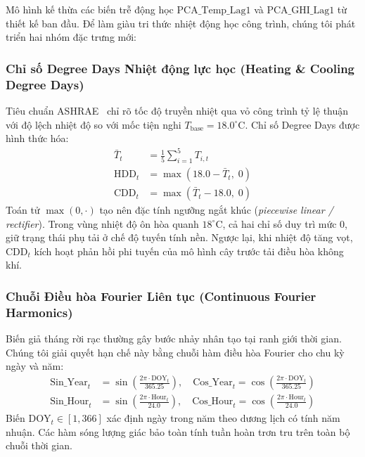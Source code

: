 Mô hình kế thừa các biến trễ động học $\text{PCA\_Temp\_Lag1}$ và $\text{PCA\_GHI\_Lag1}$ từ thiết kế ban đầu. Để làm giàu tri thức nhiệt động học công trình, chúng tôi phát triển hai nhóm đặc trưng mới:

\subsubsection{Chỉ số Degree Days Nhiệt động lực học (Heating \& Cooling Degree Days)}
\label{subsubsec:hdd_cdd}

Tiêu chuẩn ASHRAE~\cite{ashrae2021fundamentals} chỉ rõ tốc độ truyền nhiệt qua vỏ công trình tỷ lệ thuận với độ lệch nhiệt độ so với mốc tiện nghi $T_{\text{base}} = 18.0^\circ\text{C}$. Chỉ số Degree Days được hình thức hóa:
\begin{align}
    \bar{T}_t &= \frac{1}{5} \sum_{i=1}^5 T_{i, t} \\
    \text{HDD}_t &= \max\left(18.0 - \bar{T}_t, \; 0\right) \\
    \text{CDD}_t &= \max\left(\bar{T}_t - 18.0, \; 0\right)
\end{align}
Toán tử $\max(0, \cdot)$ tạo nên đặc tính ngưỡng ngắt khúc (\textit{piecewise linear / rectifier}). Trong vùng nhiệt độ ôn hòa quanh $18^\circ\text{C}$, cả hai chỉ số duy trì mức 0, giữ trạng thái phụ tải ở chế độ tuyến tính nền. Ngược lại, khi nhiệt độ tăng vọt, $\text{CDD}_t$ kích hoạt phản hồi phi tuyến của mô hình cây trước tải điều hòa không khí.

\subsubsection{Chuỗi Điều hòa Fourier Liên tục (Continuous Fourier Harmonics)}
\label{subsubsec:fourier}

Biến giả tháng rời rạc thường gây bước nhảy nhân tạo tại ranh giới thời gian. Chúng tôi giải quyết hạn chế này bằng chuỗi hàm điều hòa Fourier cho chu kỳ ngày và năm:
\begin{align}
    \text{Sin\_Year}_t &= \sin\left(\frac{2\pi \cdot \text{DOY}_t}{365.25}\right), \quad \text{Cos\_Year}_t = \cos\left(\frac{2\pi \cdot \text{DOY}_t}{365.25}\right) \\
    \text{Sin\_Hour}_t &= \sin\left(\frac{2\pi \cdot \text{Hour}_t}{24.0}\right), \quad \text{Cos\_Hour}_t = \cos\left(\frac{2\pi \cdot \text{Hour}_t}{24.0}\right)
\end{align}
Biến $\text{DOY}_t \in [1, 366]$ xác định ngày trong năm theo dương lịch có tính năm nhuận. Các hàm sóng lượng giác bảo toàn tính tuần hoàn trơn tru trên toàn bộ chuỗi thời gian.

